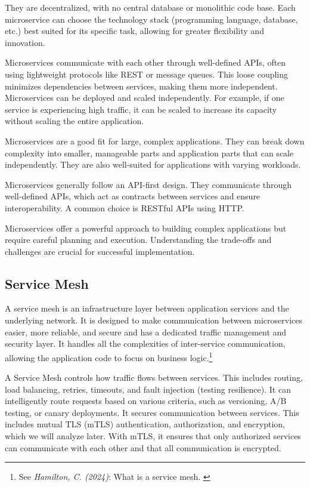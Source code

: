 They are decentralized, with no central database or monolithic code
base. Each microservice can choose the technology stack (programming
language, database, etc.) best suited for its specific task, allowing
for greater flexibility and innovation.

Microservices communicate with each other through well-defined APIs,
often using lightweight protocols like REST or message queues. This
loose coupling minimizes dependencies between services, making them more
independent. Microservices can be deployed and scaled independently. For
example, if one service is experiencing high traffic, it can be scaled
to increase its capacity without scaling the entire application.

Microservices are a good fit for large, complex applications. They can
break down complexity into smaller, manageable parts and application
parts that can scale independently. They are also well-suited for
applications with varying workloads.

Microservices generally follow an API-first design. They communicate
through well-defined APIs, which act as contracts between services and
ensure interoperability. A common choice is RESTful APIs using HTTP.

Microservices offer a powerful approach to building complex applications
but require careful planning and execution. Understanding the trade-offs
and challenges are crucial for successful implementation.

\subsection{Service Mesh}

A service mesh is an infrastructure layer between application services
and the underlying network. It is designed to make communication between
microservices easier, more reliable, and secure and has a dedicated
traffic management and security layer. It handles all the complexities
of inter-service communication, allowing the application code to focus
on business logic.\footnote{See \textit{Hamilton, C. (2024)}: What is a service mesh. \cite{whatIsMesh}}

A Service Mesh controls how traffic flows between services. This
includes routing, load balancing, retries, timeouts, and fault injection
(testing resilience). It can intelligently route requests based on
various criteria, such as versioning, A/B testing, or canary
deployments. It secures communication between services. This includes
mutual TLS (mTLS) authentication, authorization, and encryption, which
we will analyze later. With mTLS, it ensures that only authorized
services can communicate with each other and that all communication is
encrypted.

